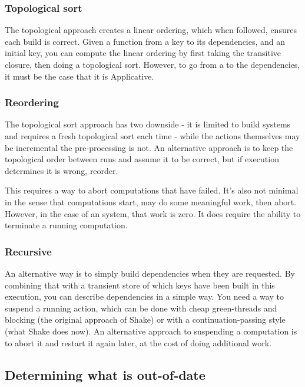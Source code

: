 \subsubsection{Topological sort}

The topological approach creates a linear ordering, which when followed, ensures each build is correct. Given a function from a key to its dependencies, and an initial key, you can compute the linear ordering by first taking the transitive closure, then doing a topological sort. However, to go from a  to the dependencies, it must be the case that it is Applicative.

\subsubsection{Reordering}

The topological sort approach has two downside - it is limited to  build systems and requires a fresh topological sort each time - while the actions themselves may be incremental the pre-processing is not. An alternative approach is to keep the topological order between runs and assume it to be correct, but if execution determines it is wrong, reorder.

This requires a way to abort computations that have failed. It's also not minimal in the sense that computations start, may do some meaningful work, then abort. However, in the case of an  system, that work is zero. It does require the ability to terminate a running computation.

\subsubsection{Recursive}

An alternative way is to simply build dependencies when they are requested. By combining that with a transient store of which keys have been built in this execution, you can describe dependencies in a simple way. You need a way to suspend a running action, which can be done with cheap green-threads and blocking (the original approach of Shake) or with a continuation-passing style (what Shake does now). An alternative approach to suspending a computation is to abort it and restart it again later, at the cost of doing additional work.


\subsection{Determining what is out-of-date}

